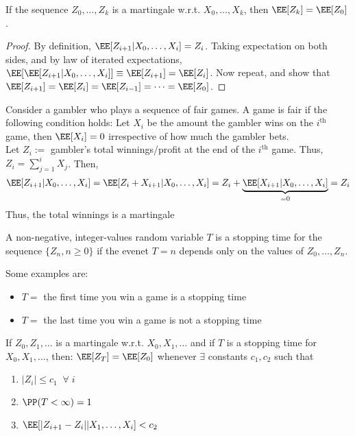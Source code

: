 \begin{lemma}
If the sequence $Z_0, \dots, Z_k$ is a martingale w.r.t. $X_0, \dots, X_k$, then $\EE[Z_k] = \EE[Z_0]$.    
\end{lemma}
\begin{proof}
By definition, $\EE[Z_{i+1}|X_0, \dots, X_i] = Z_i$. Taking expectation on both sides, and by law of iterated expectations, $\EE[\EE[Z_{i+1}|X_0, \dots, X_i]] \equiv \EE[Z_{i+1}] = \EE[Z_i]$. Now repeat, and show that $\EE[Z_{i+1}] = \EE[Z_i] = \EE[Z_{i-1}] = \dots = \EE[Z_0]$.
\end{proof}
\begin{eg}
Consider a gambler who plays a sequence of fair games. A game is fair if the following condition holds: Let $X_i$ be the amount the gambler wins on the $i^{\text{th}}$ game, then $\EE[X_i] = 0$ irrespective of how much the gambler bets. \\
Let $Z_i:= $ gambler's total winnings/profit at the end of the $i^{\text{th}}$ game. Thus, $Z_i = \sum_{j=1}^i X_j$. Then, 
\[\EE[Z_{i+1} | X_0, \dots, X_i] = \EE[Z_i + X_{i+1} | X_0, \dots, X_i] = Z_i + \underbrace{\EE[X_{i+1} | X_0, \dots, X_i]}_{= 0} = Z_i\]
Thus, the total winnings is a martingale
\end{eg}
\begin{definition}
A non-negative, integer-values random variable $T$ is a stopping time for the sequence $\{Z_n, n \geq 0\}$ if the evenet $T = n$ depends only on the values of $Z_0, \dots, Z_n$.    
\end{definition}
Some examples are:
\begin{itemize}
    \item $T = $ the first time you win a game is a stopping time
    \item $T = $ the last time you win a game is not a stopping time
\end{itemize}
\begin{theorem}
If $Z_0, Z_1, \dots$ is a martingale w.r.t. $X_0, X_1, \dots$ and if $T$ is a stopping time for $X_0, X_1, \dots$, then: $\EE[Z_T] = \EE[Z_0]$ whenever $\exists$ constants $c_1, c_2$ such that
\begin{enumerate}[label=(\roman*)]
    \item $|Z_i| \leq c_1 \;\; \forall \;i$
    \item $\PP(T < \infty) = 1$
    \item $\EE[|Z_{i+1} - Z_i| | X_1, \dots, X_{i}] < c_2$
\end{enumerate}
\end{theorem}
